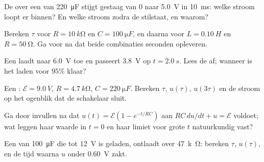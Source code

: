 \begin{exercise}[$\star$]\label{exo:g12:rc-rl-circuits:3}
De  over een  van \qty{220}{\micro F} stijgt gestaag van
$0$ naar \qty{5.0}{V} in \qty{10}{ms}: welke stroom loopt er binnen? En welke
stroom zodra de  stilstaat, en waarom?
\end{exercise}

\begin{exercise}[$\star$]\label{exo:g12:rc-rl-circuits:4}
Bereken $\tau$ voor $R = \qty{10}{k\ohm}$ en $C = \qty{100}{\micro F}$, en
daarna voor $L = \qty{0.10}{H}$ en $R = \qty{50}{\ohm}$. Ga  voor
 na dat beide combinaties seconden opleveren.
\end{exercise}

\begin{exercise}[$\star$]\label{exo:g12:rc-rl-circuits:5}
Een  laadt naar \qty{6.0}{V} toe en passeert \qty{3.8}{V} op
$t = \qty{2.0}{s}$. Lees de  af; wanneer is het laden voor
$95\%$ klaar?
\end{exercise}

\begin{exercise}[$\star\star$]\label{exo:g12:rc-rl-circuits:6}
Een : $\mathcal{E} = \qty{9.0}{V}$, $R = \qty{4.7}{k\ohm}$,
$C = \qty{220}{\micro F}$. Bereken $\tau$, $u(\tau)$, $u(3\tau)$ en de stroom
op het ogenblik dat de schakelaar sluit.
\end{exercise}

\begin{exercise}[$\star\star$]\label{exo:g12:rc-rl-circuits:7}
Ga door invullen na dat $u(t) = \mathcal{E}(1 - e^{-t/RC})$ aan
$RC\,du/dt + u = \mathcal{E}$ voldoet; wat leggen haar waarde in $t = 0$ en
haar limiet voor grote $t$ natuurkundig vast?
\end{exercise}

\begin{exercise}[$\star\star$]\label{exo:g12:rc-rl-circuits:8}
Een  van \qty{100}{\micro F} die tot \qty{12}{V} is geladen,
ontlaadt over \qty{47}{k\ohm}: bereken $\tau$, $u(\tau)$, en de tijd waarna
$u$ onder \qty{0.60}{V} zakt.
\end{exercise}

